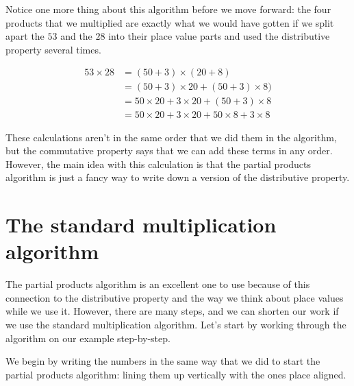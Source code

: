 \documentclass{ximera}
\begin{document}
Notice one more thing about this algorithm before we move forward: the four products that we multiplied are exactly what we would have gotten if we split apart the $53$ and the $28$ into their place value parts and used the distributive property several times.

\begin{align*}
53 \times 28 &= (50 + 3) \times (20 + 8) \\
& = (50+3) \times 20 + (50 + 3) \times 8) \\
&= 50 \times 20 + 3 \times 20 + (50+3) \times 8 \\
&= 50 \times 20 + 3 \times 20 + 50 \times 8 + 3 \times 8
\end{align*}

These calculations aren't in the same order that we did them in the algorithm, but the commutative property says that we can add these terms in any order. However, the main idea with this calculation is that the partial products algorithm is just a fancy way to write down a version of the distributive property. 


\section{The standard multiplication algorithm}

The partial products algorithm is an excellent one to use because of this connection to the distributive property and the way we think about place values while we use it. However, there are many steps, and we can shorten our work if we use the standard multiplication algorithm. Let's start by working through the algorithm on our example step-by-step.

We begin by writing the numbers in the same way that we did to start the partial products algorithm: lining them up vertically with the ones place aligned. 

\begin{image}
\end{image}
\end{document}
